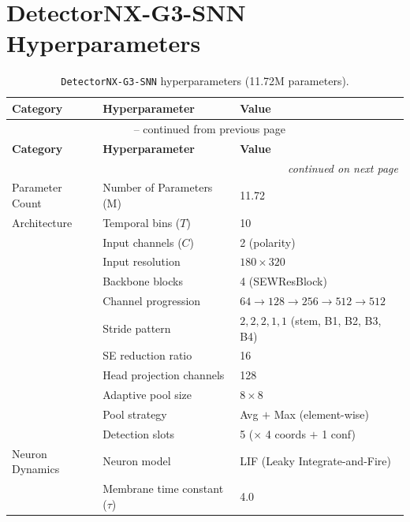\section{DetectorNX-G3-SNN Hyperparameters}

{\small
\begin{longtable}{|l|l|l|}
\caption[\texttt{DetectorNX-G3-SNN} hyperparameters.]{\texttt{DetectorNX-G3-SNN} hyperparameters (11.72M parameters).} \label{tab_app:g3_snn_params} \\
\hline
\textbf{Category} & \textbf{Hyperparameter} & \textbf{Value} \\
\hline
\endfirsthead
%
\multicolumn{3}{c}{\tablename\ \thetable{} -- continued from previous page} \\
\hline
\textbf{Category} & \textbf{Hyperparameter} & \textbf{Value} \\
\hline
\endhead
%
\hline \multicolumn{3}{r}{\textit{continued on next page}} \\
\endfoot
%
\hline
\endlastfoot
%
Parameter Count  & Number of Parameters (M)             & 11.72 \\
\hline
Architecture     & Temporal bins ($T$)                  & 10 \\
                 & Input channels ($C$)                 & 2 (polarity) \\
                 & Input resolution                     & $180 \times 320$ \\
                 & Backbone blocks                      & 4 (SEWResBlock) \\
                 & Channel progression                  & $64 \to 128 \to 256 \to 512 \to 512$ \\
                 & Stride pattern                       & $2, 2, 2, 1, 1$ (stem, B1, B2, B3, B4) \\
                 & SE reduction ratio                   & 16 \\
                 & Head projection channels             & 128 \\
                 & Adaptive pool size                   & $8 \times 8$ \\
                 & Pool strategy                        & Avg $+$ Max (element-wise) \\
                 & Detection slots                      & 5 ($\times$ 4 coords $+$ 1 conf) \\
\hline
Neuron Dynamics  & Neuron model                         & LIF (Leaky Integrate-and-Fire) \\
                 & Membrane time constant ($\tau$)      & 4.0 \\

\end{longtable}}
